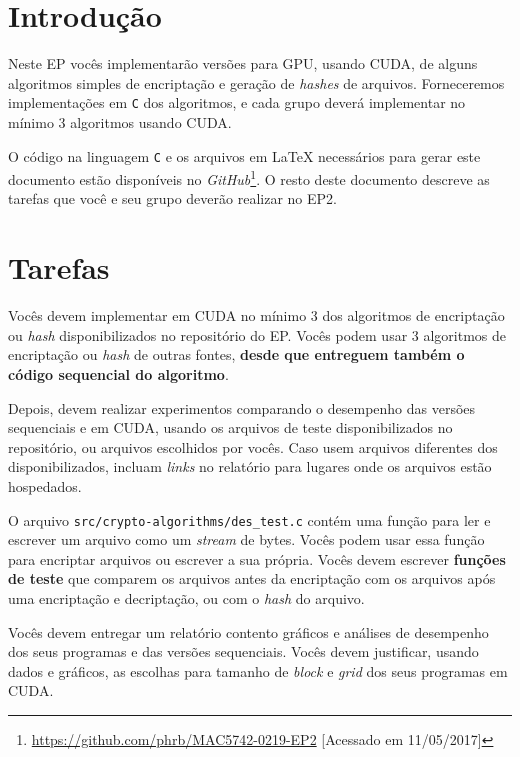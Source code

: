 \documentclass[final,12pt,a4paper]{elsarticle}
\begin{document}

\section{Introdução}

Neste EP vocês implementarão versões para GPU, usando CUDA, de alguns
algoritmos simples de encriptação e geração de \textit{hashes} de arquivos.
Forneceremos implementações em \texttt{C} dos algoritmos, e cada grupo
deverá implementar no mínimo 3 algoritmos usando CUDA.

O código na linguagem \texttt{C} e os arquivos em \LaTeX{} necessários para
gerar este documento estão disponíveis no
\textit{GitHub}\footnote{\url{https://github.com/phrb/MAC5742-0219-EP2}
[Acessado em 11/05/2017]}. O resto deste documento descreve as tarefas que você
e seu grupo deverão realizar no EP2.

\section{Tarefas}

Vocês devem implementar em CUDA no mínimo 3 dos algoritmos de encriptação ou
\textit{hash} disponibilizados no repositório do EP.
Vocês podem usar 3 algoritmos de encriptação ou \textit{hash} de outras fontes,
\textbf{desde que entreguem também o código sequencial do algoritmo}.

Depois, devem realizar experimentos comparando o desempenho das versões
sequenciais e em CUDA, usando os arquivos de teste disponibilizados no
repositório, ou arquivos escolhidos por vocês. Caso usem arquivos diferentes
dos disponibilizados, incluam \textit{links} no relatório para lugares onde os
arquivos estão hospedados.

O arquivo \texttt{src/crypto-algorithms/des\_test.c} contém uma função
para ler e escrever um arquivo como um \textit{stream} de bytes. Vocês
podem usar essa função para encriptar arquivos ou escrever a sua própria.
Vocês devem escrever \textbf{funções de teste} que comparem os arquivos antes
da encriptação com os arquivos após uma encriptação e decriptação,
ou com o \textit{hash} do arquivo.

Vocês devem entregar um relatório contento gráficos e análises de desempenho
dos seus programas e das versões sequenciais. Vocês devem justificar, usando
dados e gráficos, as escolhas para tamanho de \textit{block} e \textit{grid}
dos seus programas em CUDA.
\end{document}
